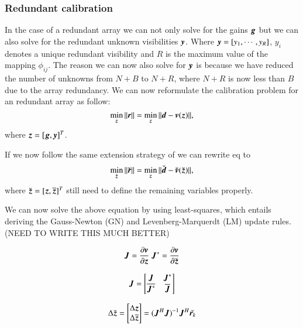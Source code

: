 \documentclass[a4paper,fleqn,usenatbib]{mnras}
\newcommand{\bz}{\bmath{z}}
\newcommand{\br}{\bmath{r}}
\newcommand{\bg}{\bmath{g}}
\newcommand{\bd}{\bmath{d}}
\newcommand{\bv}{\bmath{v}}
\newcommand{\by}{\bmath{y}}
\newcommand{\bJ}{\bmath{J}}
\newcommand{\conj}[1]{\overline{#1}}
\begin{document}
\subsubsection{Redundant calibration}
In the case of a redundant array we can not only solve for the gains $\bg$ but we can also solve for the redundant unknown visibilities $\by$. Where $\by = [y_1,\cdots,y_R]$, $y_i$ denotes 
a unique redundant visibility and $R$ is the maximum value of the mapping $\phi_{ij}$. The reason we can now also solve for $\by$ is because we have reduced the number of 
unknowns from $N+B$ to $N+R$, where $N+R$ is now less than $B$ due to the array redundancy. We can now reformulate the calibration problem for an redundant array as follow:
\begin{equation}
\min_{\bz}\|\br\| = \min_{\bz}\|\bd - \bv(\bz)\|, 
\end{equation}
where $\bz = [\bg,\by]^T$.

If we now follow the same extension strategy of \citet{Smirnov2015} we can rewrite eq to
\begin{equation}
\min_{\breve{\bz}}\|\breve{\br}\| = \min_{\bz}\|\breve{\bd} - \breve{\bv}(\breve{\bz})\|, 
\end{equation}
where $\breve{\bz} = [\bz,\conj{\bz}]^T$ still need to define the remaining variables properly.

We can now solve the above equation by using least-squares, which entails deriving the Gauss-Newton (GN) and Levenberg-Marquerdt (LM) update rules.
(NEED TO WRITE THIS MUCH BETTER)

\begin{equation}
\bJ = \frac{\partial\bv}{\partial\bz}~\bJ^* = \frac{\partial \bv}{\partial \breve{\bz}} 
\end{equation}

\begin{equation}
\bJ = \begin{bmatrix}
       \bJ & \bJ^* \\
       \conj{\bJ^*} & \conj{\bJ}  
      \end{bmatrix}
\end{equation}

\begin{equation}
 \Delta \breve{\bz} = \begin{bmatrix}\Delta \bz\\ \Delta \conj{\bz} \end{bmatrix} = (\bJ^H\bJ)^{-1}\bJ^H\breve{\br_k}
\end{equation}
\end{document}
